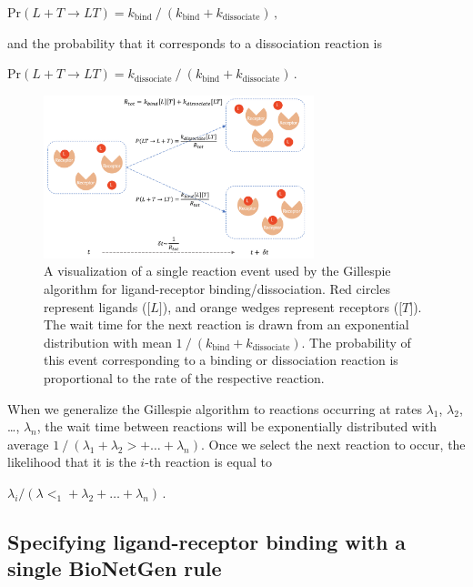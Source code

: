 \begin{center}
$\mathrm{Pr}(L + T \rightarrow LT) = k_\text{bind}\mathbin{/}(k_\text{bind} + k_\text{dissociate})\,,$
\end{center}

and the probability that it corresponds to a dissociation reaction is

\begin{center}
$\mathrm{Pr}(L + T \rightarrow LT) = k_\text{dissociate}\mathbin{/}(k_\text{bind} + k_\text{dissociate})\,.$
\end{center}

\begin{figure}[h]
\centering
\mySfFamily
\includegraphics[width = 0.7\textwidth]{../images/chemotaxis_visualizessa.png}
\caption{A visualization of a single reaction event used by the Gillespie algorithm for ligand-receptor binding/dissociation. Red circles represent ligands ($\text{[}L\text{]}$), and orange wedges represent receptors ($\text{[}T\text{]}$). The wait time for the next reaction is drawn from an exponential distribution with mean $1\mathbin{/}(k_\text{bind} + k_\text{dissociate})$. The probability of this event corresponding to a binding or dissociation reaction is proportional to the rate of the respective reaction.}
\label{fig:chemotaxis_visualizessa}
\end{figure}


When we generalize the Gillespie algorithm to  reactions occurring at rates $λ_1$, $λ_2$, …, $λ_n$, the wait time between reactions will be exponentially distributed with average $1\mathbin{/}(λ_1 + λ_2> + … + λ_n)$. Once we select the next reaction to occur, the likelihood that it is the $i$-th reaction is equal to

\begin{center}
$λ_i/(λ<_1 + λ_2 + … + λ_n)\,.$
\end{center}

\FloatBarrier
{}
\subsection{Specifying ligand-receptor binding with a single BioNetGen rule}

